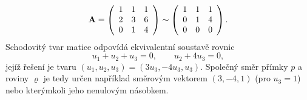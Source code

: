 \begin{mdframed}[style=mdexam]
\begin{example}
    \begin{equation*}
      \mathbf{A} =
      \left(
        \begin{array}{ccc}
          1 & 1 & 1   \\
          2 & 3 & 6   \\
          0 & 1 & 4 
        \end{array}
      \right)\sim
      \left(
        \begin{array}{ccc}
          1 & 1 & 1   \\
          0 & 1 & 4   \\
          0 & 0 & 0 
        \end{array}
      \right).
    \end{equation*}
    Schodovitý tvar matice odpovídá ekvivalentní soustavě rovnic
    \begin{equation*}
      u_1 + u_2 + u_3 = 0,\qquad u_2 + 4u_3 = 0,
    \end{equation*}
    jejíž řešení je tvaru \((u_1, u_2, u_3) = (3u_3, -4u_3, u_3)\). Společný směr přímky \(p\) a
    roviny \(\varrho\) je tedy určen například směrovým vektorem \((3, -4, 1)\) (pro \(u_3 = 1\))
    nebo kterýmkoli jeho nenulovým násobkem.
  \end{example}
\end{mdframed}